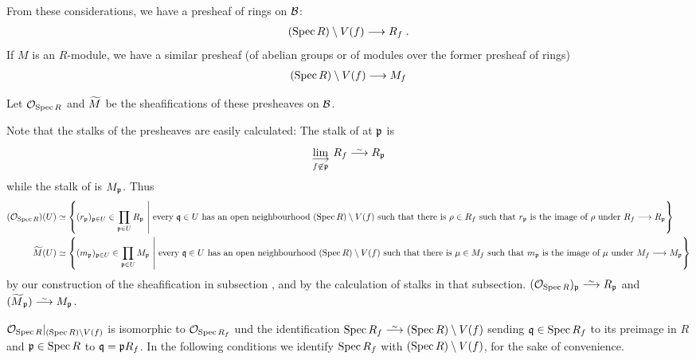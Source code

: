 \documentclass[a4paper,parskip=half,numbers=enddot, DIV=12]{scrreprt}
\begin{document}
From these considerations, we have a presheaf of rings on $\mathcal{B}$:
\begin{align}\lbl{eq:SpecRingLoc}
    (\Spec R)\setminus V(f) \morphism R_f\;.
\end{align}
If $M$ is an $R$-module, we have a similar presheaf (of abelian groups or of modules over the former presheaf of rings)
\begin{align} \lbl{eq:SpecModuleLoc}
    (\Spec R)\setminus V(f) \morphism M_f
\end{align}
\begin{defi}
    Let $\mathcal{O}_{\operatorname{Spec} R}$ and $\snake M$ be the sheafifications of these presheaves on $\mathcal{B}$.
\end{defi}
\begin{rem*}
    Note that the stalks of the presheaves are easily calculated: The stalk of  at $\mathfrak{p}$ is 
    \begin{align*}
        \colimit[f\not \in \pp] R_f \isomorphism R_\pp
    \end{align*}
    while the stalk of  is $M_{\mathfrak{p}}$. Thus
    \begin{align*}
        (\Oo_{\Spec R})(U) &\simeq \left\{(r_\pp)_{\pp\in U}\in \prod_{\pp\in U} R_\pp \st \text{every } \qq\in U \text{ has an open neighbourhood } (\Spec R)\setminus V(f) \text{ such that there is } \rho \in R_f \text{ such that } r_\pp \text{ is the image of } \rho \text{ under } R_f\morphism R_\pp\right\}\\
        \snake M(U) &\simeq \left\{(m_\pp)_{\pp\in U}\in \prod_{\pp\in U} M_\pp \st \text{every } \qq\in U \text{ has an open neighbourhood } (\Spec R)\setminus V(f) \text{ such that there is } \mu \in M_f \text{ such that } m_\pp \text{ is the image of } \mu \text{ under } M_f\morphism M_\pp\right\}
    \end{align*}
    by our construction of the sheafification in subsection , and by the calculation of stalks in that subsection. $(\Oo_{\Spec R})_\pp \isomorphism R_\pp$ and $(\snake M_\pp)\isomorphism M_\pp$.
\end{rem*}
\begin{fact}
    $\mathcal{O}_{\operatorname{Spec} R}|_{(\operatorname{Spec} R)\setminus V(f)}$ is isomorphic to $\mathcal{O}_{\operatorname{Spec} R_f}$ und the identification $\Spec R_f\isomorphism (\Spec R)\setminus V(f)$ sending $\mathfrak{q}\in \operatorname{Spec} R_f$ to its preimage in $R$ and $\mathfrak{p}\in \operatorname{Spec} R$ to $\mathfrak{q} = \mathfrak{p} R_f$. In the following conditions we identify $\operatorname{Spec} R_f$ with $(\operatorname{Spec} R)\setminus V(f)$, for the sake of convenience.
\end{fact}
\end{document}
